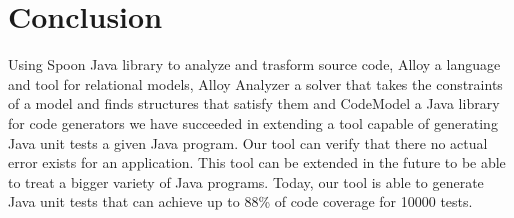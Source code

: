 \chapter*{Conclusion}
\label{ch:Conclusion}
	\thispagestyle{conclusion}
	 Using Spoon Java library to analyze and trasform source code, Alloy a language and tool for relational models, Alloy Analyzer a solver that takes the constraints of a model and finds structures that satisfy them and CodeModel a Java library for code generators we have succeeded in extending a tool capable of generating Java unit tests a given Java program. Our tool can verify that there no actual error exists for an application. This tool can be extended in the future to be able to treat a bigger variety of Java programs. Today, our tool is able to generate Java unit tests that can achieve up to 88\% of code coverage for 10000 tests.